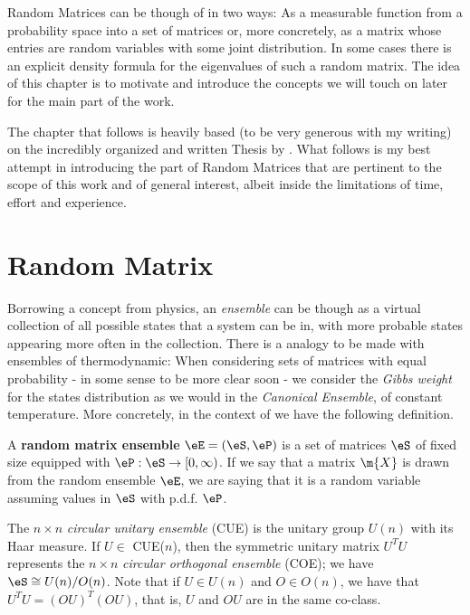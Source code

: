 Random Matrices can be though of in two ways: As a measurable function from a probability space into a set of matrices or, more concretely, as a matrix whose entries are random variables with some joint distribution. In some cases there is an explicit density formula for the eigenvalues of such a random matrix. The idea of this chapter is to motivate and introduce the concepts we will touch on later for the main part of the work. 

The chapter that follows is heavily based (to be very generous with my writing) on the incredibly organized and written Thesis by  . What follows is my best attempt in introducing the part of Random Matrices that are pertinent to the scope of this work and of general interest, albeit inside the limitations of time, effort and experience. 

\section{Random Matrix}

Borrowing a concept from physics, an \textit{ensemble} can be though as a virtual collection of all possible states that a system can be in, with more probable states appearing more often in the collection. There is a analogy to be made with ensembles of thermodynamic: When considering sets of matrices with equal probability - in some sense to be more clear soon - we consider the \textit{Gibbs weight} for the states distribution as we would in the \textit{Canonical Ensemble}, of constant temperature. More concretely, in the context of  we have the following definition.

\begin{definicao}
	A \textbf{random matrix ensemble} $\eE = (\eS, \eP)$ is a set of matrices $\eS$ of fixed size equipped with  $\eP: \eS \rightarrow [0, \infty)$. If we say that a matrix $\m{X}$ is drawn from the random ensemble $\eE$, we are saying that it is a random variable assuming values in $\eS$ with p.d.f. $\eP$.
	\label{Definition: Matrix Ensemble}
\end{definicao}

\begin{exemplo}
	The $n \times n$ \textit{circular unitary ensemble} (CUE) is the unitary group $U(n)$ with its Haar measure. If $U \in$ CUE($n$), then the symmetric unitary matrix $U^TU$ represents the $n \times n$ \textit{circular orthogonal ensemble} (COE); we have $\eS \cong U(n)/O(n)$. Note that if $U \in U(n)$ and $O \in O(n)$, we have that $U^TU = (OU)^T(OU)$, that is, $U$ and $OU$ are in the same co-class.
\end{exemplo}

